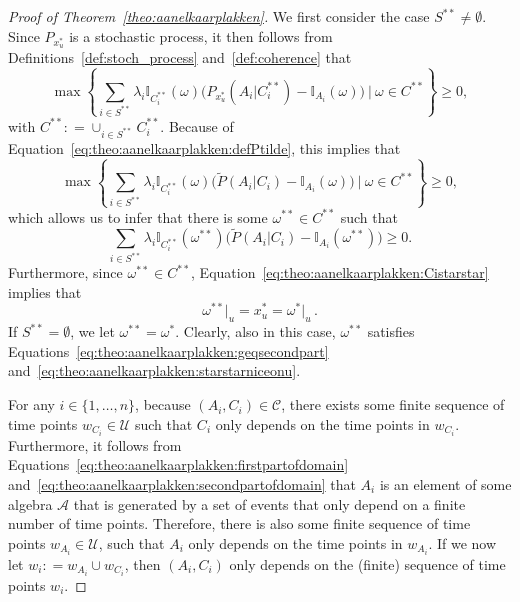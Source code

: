 \documentclass[10pt,a4paper]{paper}
\theoremstyle{definition}
\newcommand{\ind}[1]{\mathbb{I}_{#1}}
\newcommand{\coloneqq}{:\!=}
\begin{document}
\begin{proof}[Proof of Theorem~\ref{theo:aanelkaarplakken}]
We first consider the case $S^{**}\neq\emptyset$. Since $P_{x_u^*}$ is a stochastic process, it then follows from Definitions~\ref{def:stoch_process} and~\ref{def:coherence} that
\begin{equation*}%
\max\left\{\sum_{i\in S^{**}}\lambda_i\ind{C_i^{**}}(\omega)\bigl(P_{x_u^*}(A_i\vert C_i^{**})-\ind{A_i}(\omega)\bigr)~\Bigg\vert~\omega\in C^{**}\right\}\geq0,
\end{equation*}
with $C^{**}\coloneqq\cup_{i\in S^{**}}C_i^{**}$. Because of Equation~\eqref{eq:theo:aanelkaarplakken:defPtilde}, this implies that
\begin{equation*}%
\max\left\{\sum_{i\in S^{**}}\lambda_i\ind{C_i^{**}}(\omega)\bigl(\tilde{P}(A_i\vert C_i)-\ind{A_i}(\omega)\bigr)~\Bigg\vert~\omega\in C^{**}\right\}\geq0,
\end{equation*}
which allows us to infer that there is some $\omega^{**}\in C^{**}$ such that
\begin{equation}\label{eq:theo:aanelkaarplakken:geqsecondpart}
\sum_{i\in S^{**}}\lambda_i\ind{C_i^{**}}(\omega^{**})\bigl(\tilde{P}(A_i\vert C_i)-\ind{A_i}(\omega^{**})\bigr)\geq0.
\end{equation}
Furthermore, since $\omega^{**}\in C^{**}$, Equation~\eqref{eq:theo:aanelkaarplakken:Cistarstar} implies that
\begin{equation}\label{eq:theo:aanelkaarplakken:starstarniceonu}
\omega^{**}\vert_u=x_u^* = \omega^{*}\vert_u\,.
\end{equation}
If $S^{**}=\emptyset$, we let $\omega^{**}=\omega^{*}$. Clearly, also in this case, $\omega^{**}$ satisfies Equations~\eqref{eq:theo:aanelkaarplakken:geqsecondpart} and~\eqref{eq:theo:aanelkaarplakken:starstarniceonu}.

For any $i\in\{1,\ldots,n\}$, because $(A_i,C_i)\in\mathcal{C}$, there exists some finite sequence of time points $w_{C_i}\in\mathcal{U}$ such that $C_i$ only depends on the time points in $w_{C_i}$. Furthermore, it follows from Equations~\eqref{eq:theo:aanelkaarplakken:firstpartofdomain} and~\eqref{eq:theo:aanelkaarplakken:secondpartofdomain} that $A_i$ is an element of some algebra $\mathcal{A}$ that is generated by a set of events that only depend on a finite number of time points. Therefore, there is also some finite sequence of time points $w_{A_i}\in\mathcal{U}$, such that $A_i$ only depends on the time points in $w_{A_i}$. If we now let $w_i\coloneqq w_{A_i}\cup w_{C_i}$, then $(A_i,C_i)$ only depends on the (finite) sequence of time points $w_i$.


\end{proof}
\end{document}
